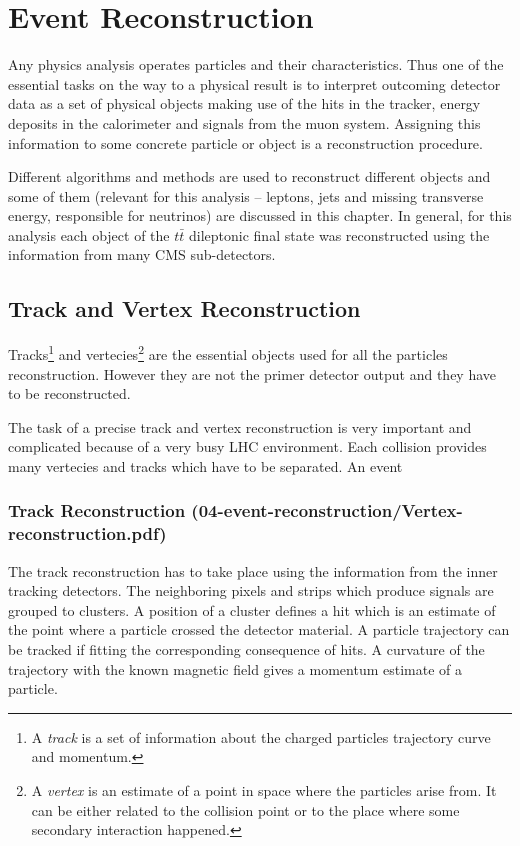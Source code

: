 \chapter{Event Reconstruction}\label{chapt:event_selection}

Any physics analysis operates particles and their characteristics. Thus one of the essential tasks on the way to a physical
result is to interpret outcoming detector data as a set of physical objects making use of the hits
in the tracker, energy deposits in the calorimeter and signals from the muon system. Assigning this information to some concrete particle 
or object is a reconstruction procedure.

Different algorithms and methods are used to reconstruct different objects and some of them (relevant for this analysis -- leptons, jets and missing transverse
energy, responsible for neutrinos) are discussed in this
chapter. In general, for this analysis each object of the $t\bar{t}$ dileptonic final state was reconstructed using the information from many
CMS sub-detectors.

\section{Track and Vertex Reconstruction}
 
Tracks\footnote{A \textit{track} is a set of information about the charged particles trajectory curve and momentum.} and vertecies\footnote{A 
\textit{vertex} is an estimate of a point in space where the particles arise from. It can be either related to the 
collision point or to the place  where some secondary interaction happened.} are the essential objects used for all the particles reconstruction. 
However they are not the primer detector output and they have to be reconstructed.

The task of a precise track and vertex reconstruction is very important and complicated because of a very busy LHC environment. Each collision
provides many vertecies and tracks which have to be separated. An event

\subsection{Track Reconstruction (04-event-reconstruction/Vertex-reconstruction.pdf)}

The track reconstruction has to take place using the information from the inner tracking detectors. The neighboring pixels and strips which
produce signals are grouped to clusters. A position of a cluster defines a hit which is an estimate of the point where a particle crossed the
detector material. A particle trajectory can be tracked if fitting the corresponding consequence of hits. A curvature 
of the trajectory with the known magnetic field gives a momentum estimate of a particle.

